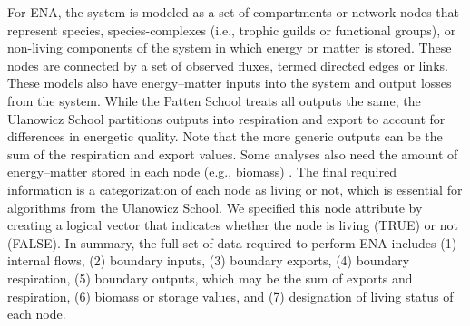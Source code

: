 \documentclass[11pt]{article}
\begin{document}
\begin{spacing}{2}
For ENA, the system is modeled as a set of compartments or network nodes that
represent species, species-complexes (i.e., trophic guilds or
functional groups), or non-living components of the system in which
energy or matter is stored.  These nodes are connected by a set of
observed fluxes, termed directed edges or links.  %
These models also have energy--matter inputs into the system
 and output losses from the system.
While the Patten School treats all outputs the same, the Ulanowicz
School partitions outputs into respiration %
and export 
to account for differences in energetic quality. Note that the more
generic outputs can be the sum of the respiration and export values.
Some analyses also need the amount of energy--matter stored in each
node (e.g., biomass)%
.  The final required information is a categorization of each node as
living or not, which is essential for algorithms from the Ulanowicz
School.  We specified this node attribute by creating a logical vector
that indicates whether the %
node is living (TRUE) or not (FALSE).  In summary, the full set of
data required to perform ENA includes (1) internal flows, (2) boundary
inputs, (3) boundary exports, (4) boundary respiration, (5) boundary
outputs, which may be the sum of exports and respiration, (6) biomass
or storage values, and (7) designation of living status of each node.


\end{spacing}
\end{document}
